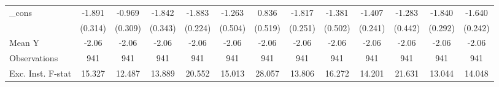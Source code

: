 {\begin{tabular}{l*{12}{c}}
\addlinespace
\_cons      &      -1.891\sym{***}&      -0.969\sym{***}&      -1.842\sym{***}&      -1.883\sym{***}&      -1.263\sym{**} &       0.836         &      -1.817\sym{***}&      -1.381\sym{***}&      -1.407\sym{***}&      -1.283\sym{***}&      -1.840\sym{***}&      -1.640\sym{***}\\
            &     (0.314)         &     (0.309)         &     (0.343)         &     (0.224)         &     (0.504)         &     (0.519)         &     (0.251)         &     (0.502)         &     (0.241)         &     (0.442)         &     (0.292)         &     (0.242)         \\
\midrule
Mean Y      &       -2.06         &       -2.06         &       -2.06         &       -2.06         &       -2.06         &       -2.06         &       -2.06         &       -2.06         &       -2.06         &       -2.06         &       -2.06         &       -2.06         \\
Observations&         941         &         941         &         941         &         941         &         941         &         941         &         941         &         941         &         941         &         941         &         941         &         941         \\
Exc. Inst. F-stat&      15.327         &      12.487         &      13.889         &      20.552         &      15.013         &      28.057         &      13.806         &      16.272         &      14.201         &      21.631         &      13.044         &      14.048         \\
\bottomrule
\end{tabular}
}
